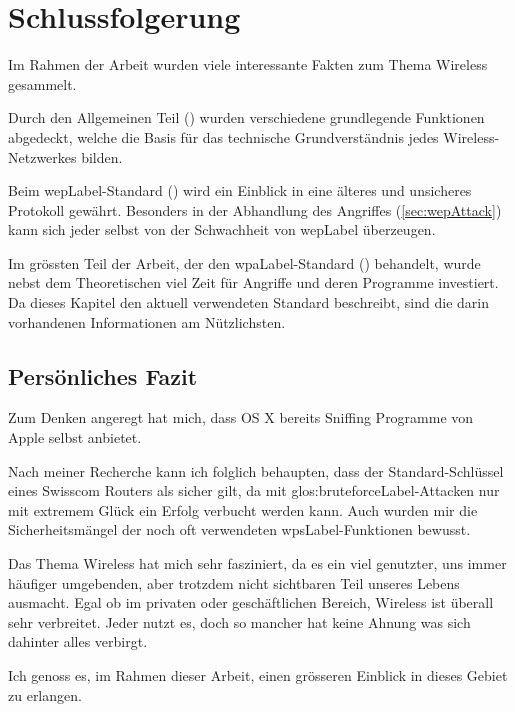 \chapter{Schlussfolgerung}

Im Rahmen der Arbeit wurden viele interessante Fakten zum Thema Wireless gesammelt.

Durch den Allgemeinen Teil () wurden verschiedene grundlegende Funktionen abgedeckt, welche die Basis für das technische Grundverständnis jedes Wireless-Netzwerkes bilden.

Beim \gls{wepLabel}-Standard () wird ein Einblick in eine älteres und unsicheres Protokoll gewährt.
Besonders in der Abhandlung des Angriffes (\cref{sec:wepAttack}) kann sich jeder selbst von der Schwachheit von \gls{wepLabel} überzeugen.

Im grössten Teil der Arbeit, der den \gls{wpaLabel}-Standard () behandelt, wurde nebst dem Theoretischen viel Zeit für Angriffe und deren Programme investiert.
Da dieses Kapitel den aktuell verwendeten Standard beschreibt, sind die darin vorhandenen Informationen am Nützlichsten.


\section{Persönliches Fazit}
Zum Denken angeregt hat mich, dass OS X bereits Sniffing Programme von Apple selbst anbietet.

Nach meiner Recherche kann ich folglich behaupten, dass der Standard-Schlüssel eines Swisscom Routers als sicher gilt, da mit \gls{glos:bruteforceLabel}-Attacken nur mit extremem Glück ein Erfolg verbucht werden kann.
Auch wurden mir die Sicherheitsmängel der noch oft verwendeten \gls{wpsLabel}-Funktionen bewusst.

Das Thema Wireless hat mich sehr fasziniert, da es ein viel genutzter, uns immer häufiger umgebenden, aber trotzdem nicht sichtbaren Teil unseres Lebens ausmacht.
Egal ob im privaten oder geschäftlichen Bereich, Wireless ist überall sehr verbreitet.
Jeder nutzt es, doch so mancher hat keine Ahnung was sich dahinter alles verbirgt.

Ich genoss es, im Rahmen dieser Arbeit, einen grösseren Einblick in dieses Gebiet zu erlangen.
